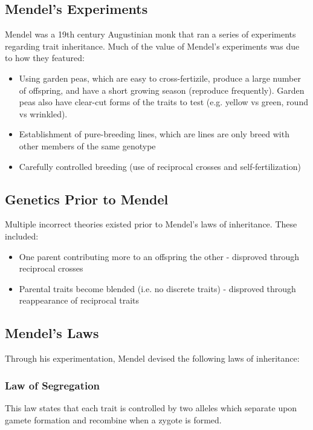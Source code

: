 \documentclass[12pt,titlepage]{article}
\begin{document}
    \subsection{Mendel's Experiments}
      Mendel was a 19th century Augustinian monk that ran a series of experiments regarding trait inheritance. Much of the value of
      Mendel's experiments was due to how they featured:
      \begin{itemize}
        \item Using garden peas, which are easy to cross-fertizile, produce a large number of offspring, and have a short growing season
          (reproduce frequently). Garden peas also have clear-cut forms of the traits to test (e.g. yellow vs green, round vs wrinkled).
        \item Establishment of pure-breeding lines, which are lines are only breed with other members of the same genotype
        \item Carefully controlled breeding (use of reciprocal crosses and self-fertilization)
      \end{itemize}

    \subsection{Genetics Prior to Mendel}
      Multiple incorrect theories existed prior to Mendel's laws of inheritance. These included:
      \begin{itemize}
        \item One parent contributing more to an offspring the other - disproved through reciprocal crosses
        \item Parental traits become blended (i.e. no discrete traits) - disproved through reappearance of reciprocal traits
      \end{itemize}

    \subsection{Mendel's Laws}
      Through his experimentation, Mendel devised the following laws of inheritance:

      \subsubsection{Law of Segregation}
        This law states that each trait is controlled by two alleles which separate upon gamete formation and recombine when a zygote is
        formed.
\end{document}
